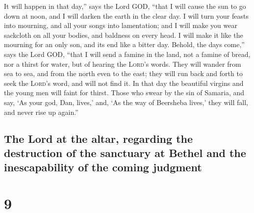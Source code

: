 It will happen in that day,'' says the Lord GOD, ``that I
will cause the sun to go down at noon, and I will darken the earth in
the clear day.  I will turn your feasts into mourning,
and all your songs into lamentation; and I will make you wear sackcloth
on all your bodies, and baldness on every head. I will make it like the
mourning for an only son, and its end like a bitter day. 
Behold, the days come,'' says the Lord GOD, ``that I will send a famine
in the land, not a famine of bread, nor a thirst for water, but of
hearing the \textsc{Lord}'s words.  They will wander from
sea to sea, and from the north even to the east; they will run back and
forth to seek the \textsc{Lord}'s word, and will not find it.
 In that day the beautiful virgins and the young men will
faint for thirst.  Those who swear by the sin of Samaria,
and say, `As your god, Dan, lives,' and, `As the way of Beersheba
lives,' they will fall, and never rise up again.''

\hypertarget{the-lord-at-the-altar-regarding-the-destruction-of-the-sanctuary-at-bethel-and-the-inescapability-of-the-coming-judgment}{%
\subsection{The Lord at the altar, regarding the destruction of the
sanctuary at Bethel and the inescapability of the coming
judgment}\label{the-lord-at-the-altar-regarding-the-destruction-of-the-sanctuary-at-bethel-and-the-inescapability-of-the-coming-judgment}}

\hypertarget{section-8}{%
\section{9}\label{section-8}}

